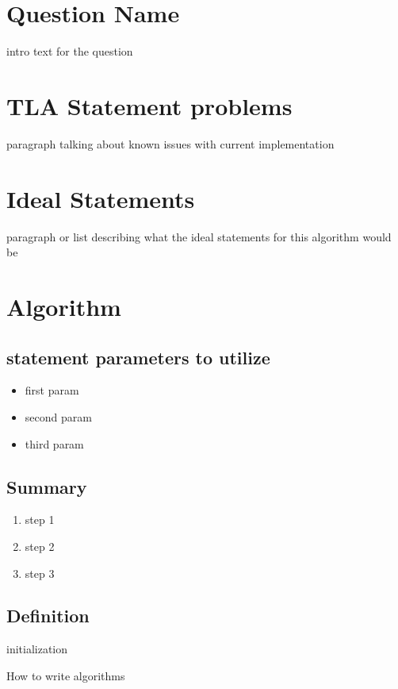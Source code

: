 \documentclass{article}
\begin{document}
\section*{Question Name}
intro text for the question

\section{TLA Statement problems}
paragraph talking about known issues with current implementation

\section{Ideal Statements}
paragraph or list describing what the ideal statements for this algorithm would be
\section{Algorithm}
\subsection{statement parameters to utilize}

\begin{itemize}
  \item first param
  \item second param
  \item third param
  \end{itemize}
\subsection{Summary}
\begin{enumerate}
  \item step 1
  \item step 2
  \item step 3
  \end{enumerate}

  \subsection{Definition}
  \begin{algorithm}[H]
    \SetAlgoLined
    initialization\;
    \caption{How to write algorithms}
  \end{algorithm}
\end{document}
